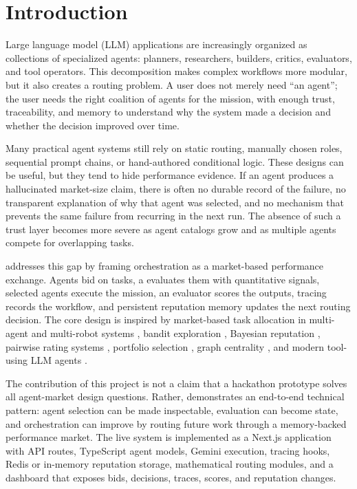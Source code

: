 \section{Introduction}

Large language model (LLM) applications are increasingly organized as collections of specialized agents: planners, researchers, builders, critics, evaluators, and tool operators. This decomposition makes complex workflows more modular, but it also creates a routing problem. A user does not merely need ``an agent''; the user needs the right coalition of agents for the mission, with enough trust, traceability, and memory to understand why the system made a decision and whether the decision improved over time.

Many practical agent systems still rely on static routing, manually chosen roles, sequential prompt chains, or hand-authored conditional logic. These designs can be useful, but they tend to hide performance evidence. If an agent produces a hallucinated market-size claim, there is often no durable record of the failure, no transparent explanation of why that agent was selected, and no mechanism that prevents the same failure from recurring in the next run. The absence of such a trust layer becomes more severe as agent catalogs grow and as multiple agents compete for overlapping tasks.

\systemname{} addresses this gap by framing orchestration as a market-based performance exchange. Agents bid on tasks, a \marketmaker{} evaluates them with quantitative signals, selected agents execute the mission, an evaluator scores the outputs, tracing records the workflow, and persistent reputation memory updates the next routing decision. The core design is inspired by market-based task allocation in multi-agent and multi-robot systems \citep{smith1980contractnet,gerkey2004taxonomy,dias2006marketbased}, bandit exploration \citep{auer2002finite}, Bayesian reputation \citep{josang2002beta}, pairwise rating systems \citep{elo1978rating,bradley1952rank}, portfolio selection \citep{markowitz1952portfolio}, graph centrality \citep{page1999pagerank}, and modern tool-using LLM agents \citep{yao2023react,schick2023toolformer,wu2023autogen}.

The contribution of this project is not a claim that a hackathon prototype solves all agent-market design questions. Rather, \systemname{} demonstrates an end-to-end technical pattern: agent selection can be made inspectable, evaluation can become state, and orchestration can improve by routing future work through a memory-backed performance market. The live system is implemented as a Next.js application with API routes, TypeScript agent models, Gemini execution, \weave{} tracing hooks, Redis or in-memory reputation storage, mathematical routing modules, and a dashboard that exposes bids, decisions, traces, scores, and reputation changes.
